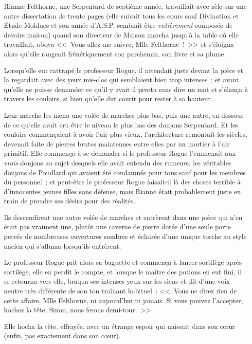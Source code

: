 \later

Rianne Felthorne, une Serpentard de septième année, travaillait avec zèle sur une autre dissertation de trente pages (elle suivait tous les cours sauf Divination et Étude Moldues et son année d'A.S.P. semblait être \emph{entièrement} composée de devoirs maison) quand son directeur de Maison marcha jusqu'à la table où elle travaillait, aboya <<~Vous allez me suivre, Mlle Felthorne~!~>> et s'éloigna alors qu'elle rangeait frénétiquement son parchemin, son livre et sa plume.

Lorsqu'elle eut rattrapé le professeur Rogue, il attendait juste devant la pièce et la regardait avec des yeux mis-clos qui semblaient bien trop intenses~; et avant qu'elle ne puisse demander ce qu'il y avait il pivota sans dire un mot et s'élança à travers les couloirs, si bien qu'elle dut courir pour rester à sa hauteur.

Leur marche les mena une volée de marches plus bas, puis une autre, en dessous de ce qu'elle avait cru être le niveau le plus bas des donjons Serpentard. Et les couloirs commençaient à avoir l'air plus vieux, l'architecture remontait les siècles, devenait faite de pierres brutes maintenues entre elles par un mortier à l'air primitif. Elle commença à se demander si le professeur Rogue l'emmenait aux \emph{vrais} donjons au sujet desquels elle avait entendu des rumeurs, les véritables donjons de Poudlard qui avaient été condamnés pour tous sauf pour les membres du personnel~; et peut-être le professeur Rogue faisait-il là des choses terrible à d'innocentes jeunes filles sans défense, mais Rianne était probablement juste en train de prendre ses désirs pour des réalités.

Ils descendirent une autre volée de marches et entrèrent dans une pièce qui n'en était pas vraiment une, plutôt une caverne de pierre dotée d'une seule porte percée de nombreuses ouvertures sombres et éclairée d'une unique torche au style ancien qui s'alluma lorsqu'ils entrèrent.

Le professeur Rogue prit alors sa baguette et commença à lancer sortilège après sortilège, elle en perdit le compte, et lorsque le maître des potions en eut fini, il se retourna vers elle, braqua ses intenses yeux sur les siens et dit d'une voix neutre très différente de son ton traînant habituel~: <<~Vous ne direz rien de cette affaire, Mlle Felthorne, ni aujourd'hui ni jamais. Si vous pouvez l'accepter, hochez la tête. Sinon, nous ferons demi-tour.~>>

Elle hocha la tête, effrayée, avec un étrange espoir qui naissait dans son cœur (enfin, pas exactement dans son cœur).

